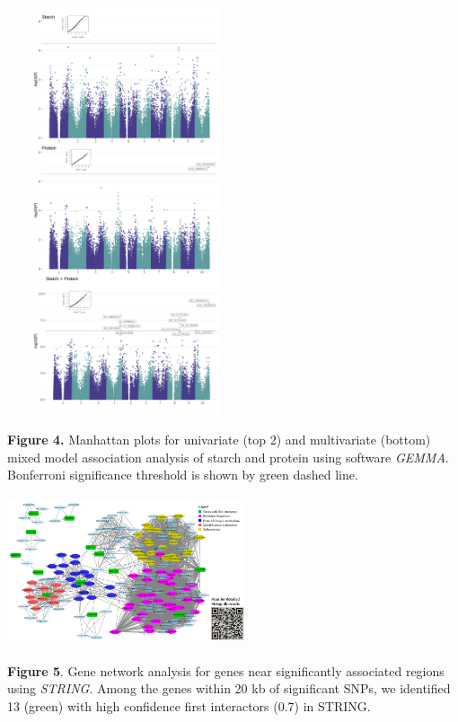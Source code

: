 \documentclass[a0paper,portrait]{baposter}
\begin{document}
\begin{poster}
{\begin{center}
\includegraphics [height=120mm, width=70mm] {Starch_protein_GWAS_plots.png}
\end{center}
\textbf{Figure 4.} Manhattan plots for univariate (top 2) and multivariate (bottom) mixed model association analysis of starch and protein using software \textit{GEMMA}. Bonferroni significance threshold is shown by green dashed line.\\
}
{
\begin{center}
\includegraphics [height=44mm, width=70mm] {string_edited.png}
\end{center}
\textbf{Figure 5}. Gene network analysis for genes near significantly associated regions using \textit{STRING}. Among the genes within 20 kb of significant SNPs, we identified 13 (green) with high confidence first interactors (0.7) in STRING.}\\


\end{poster}
\end{document}
